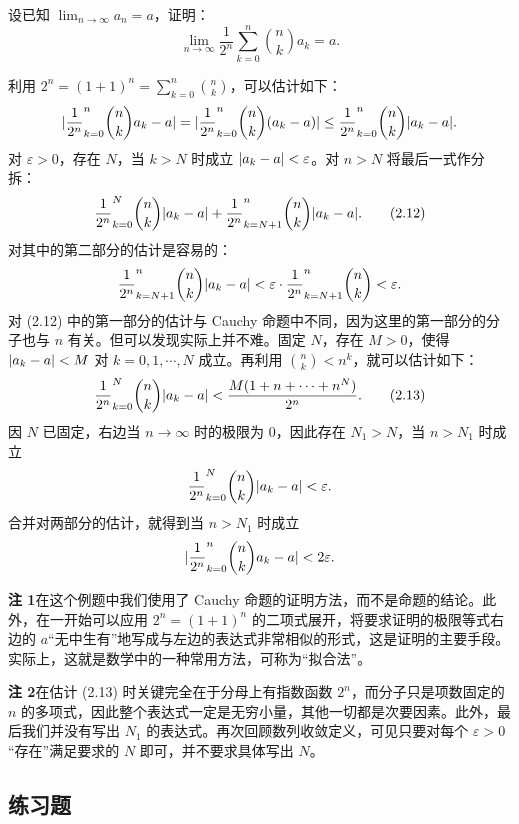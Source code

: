 \begin{xexample}[2.4.3]
设已知 $\displaystyle\lim_{n\to\infty}a_n=a$，证明：
\[
  \lim_{n\to\infty}\frac1{2^n}\sum_{k=0}^n\binom nk a_k=a.
\]
\end{xexample}
\begin{xproof}
利用 $2^n=(1+1)^n=\displaystyle\sum_{k=0}^n\binom nk$，可以估计如下：
\[
  \lvert\frac1{2^n}\relax_{k=0}^n\binom nk a_k-a\rvert
  =\lvert\frac1{2^n}\relax_{k=0}^n\binom nk(a_k-a)\rvert
  \le\frac1{2^n}\relax_{k=0}^n\binom nk\lvert a_k-a\rvert.
\]
对 $\varepsilon>0$，存在 $N$，当 $k>N$ 时成立 $\lvert a_k-a\rvert<\varepsilon$。对 $n>N$ 将最后一式作分拆：
\begin{equation}
  \frac1{2^n}\relax_{k=0}^N\binom nk\lvert a_k-a\rvert
  +\frac1{2^n}\relax_{k=N+1}^n\binom nk\lvert a_k-a\rvert.
  \tag{2.12}
  \label{eq:2.12}
\end{equation}
对其中的第二部分的估计是容易的：
\[
  \frac1{2^n}\relax_{k=N+1}^n\binom nk\lvert a_k-a\rvert
  <\varepsilon\cdot\frac1{2^n}\relax_{k=N+1}^n\binom nk<\varepsilon.
\]
对 (2.12) 中的第一部分的估计与 Cauchy 命题中不同，因为这里的第一部分的分子也与 $n$ 有关。但可以发现实际上并不难。固定 $N$，存在 $M>0$，使得 $\lvert a_k-a\rvert<M$ 对 $k=0,1,\cdots,N$ 成立。再利用 $\binom nk<n^k$，就可以估计如下：
\begin{equation}
  \frac1{2^n}\relax_{k=0}^N\binom nk\lvert a_k-a\rvert
  <\frac{M(1+n+\cdots+n^N)}{2^n}.
  \tag{2.13}
  \label{eq:2.13}
\end{equation}
因 $N$ 已固定，右边当 $n\to\infty$ 时的极限为 0，因此存在 $N_1>N$，当 $n>N_1$ 时成立
\[
  \frac1{2^n}\relax_{k=0}^N\binom nk\lvert a_k-a\rvert<\varepsilon.
\]
合并对两部分的估计，就得到当 $n>N_1$ 时成立
\[
  \lvert\frac1{2^n}\relax_{k=0}^n\binom nk a_k-a\rvert<2\varepsilon.
\]
\end{xproof}

\begin{xremark}
\textbf{注 1}\quad 在这个例题中我们使用了 Cauchy 命题的证明方法，而不是命题的结论。此外，在一开始可以应用 $2^n=(1+1)^n$ 的二项式展开，将要求证明的极限等式右边的 $a$“无中生有”地写成与左边的表达式非常相似的形式，这是证明的主要手段。实际上，这就是数学中的一种常用方法，可称为“拟合法”。

\textbf{注 2}\quad 在估计 (2.13) 时关键完全在于分母上有指数函数 $2^n$，而分子只是项数固定的 $n$ 的多项式，因此整个表达式一定是无穷小量，其他一切都是次要因素。此外，最后我们并没有写出 $N_1$ 的表达式。再次回顾数列收敛定义，可见只要对每个 $\varepsilon>0$“存在”满足要求的 $N$ 即可，并不要求具体写出 $N$。
\end{xremark}

\subsection{练习题}

